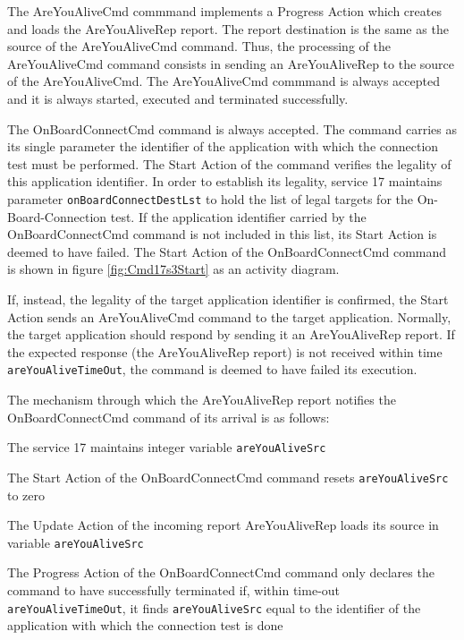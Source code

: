 \documentclass[a4paper,10pt]{article}
\newenvironment{fw_itemize}						%
{\begin{itemize}
  \setlength{\itemsep}{1mm}
  \setlength{\parskip}{0pt}
  \setlength{\parsep}{0pt}}
{\end{itemize}}
\begin{document}
The AreYouAliveCmd commmand implements a Progress Action which creates and loads the AreYouAliveRep report. The report destination is the same as the source of the AreYouAliveCmd command. Thus, the processing of the AreYouAliveCmd command consists in sending an AreYouAliveRep to the source of the AreYouAliveCmd. The AreYouAliveCmd commmand is always accepted and it is always started, executed and terminated successfully.

The OnBoardConnectCmd command is always accepted. The command carries as its single parameter the identifier of the application with which the connection test must be performed. The Start Action of the command verifies the legality of this application identifier. In order to establish its legality, service 17 maintains parameter \texttt{onBoardConnectDestLst} to hold the list of legal targets for the On-Board-Connection test. If the application identifier carried by the OnBoardConnectCmd command is not included in this list, its Start Action is deemed to have failed. The Start Action of the OnBoardConnectCmd command is shown in figure \ref{fig:Cmd17s3Start} as an activity diagram.

If, instead, the legality of the target application identifier is confirmed, the Start Action sends an AreYouAliveCmd command to the target application. Normally, the target application should respond by sending it an AreYouAliveRep report. If the expected response (the AreYouAliveRep report) is not received within time \texttt{areYouAliveTimeOut}, the command is deemed to have failed its execution.

The mechanism through which the AreYouAliveRep report notifies the OnBoardConnectCmd command of its arrival is as follows:

\begin{fw_itemize}
\item The service 17 maintains integer variable \texttt{areYouAliveSrc}
\item The Start Action of the OnBoardConnectCmd command resets \texttt{areYouAliveSrc} to zero
\item The Update Action of the incoming report AreYouAliveRep loads its source in variable \texttt{areYouAliveSrc}
\item The Progress Action of the OnBoardConnectCmd command only declares the command to have successfully terminated if, within time-out \texttt{areYouAliveTimeOut}, it finds \texttt{areYouAliveSrc} equal to the identifier of the application with which the connection test is done
\end{fw_itemize}
\end{document}
